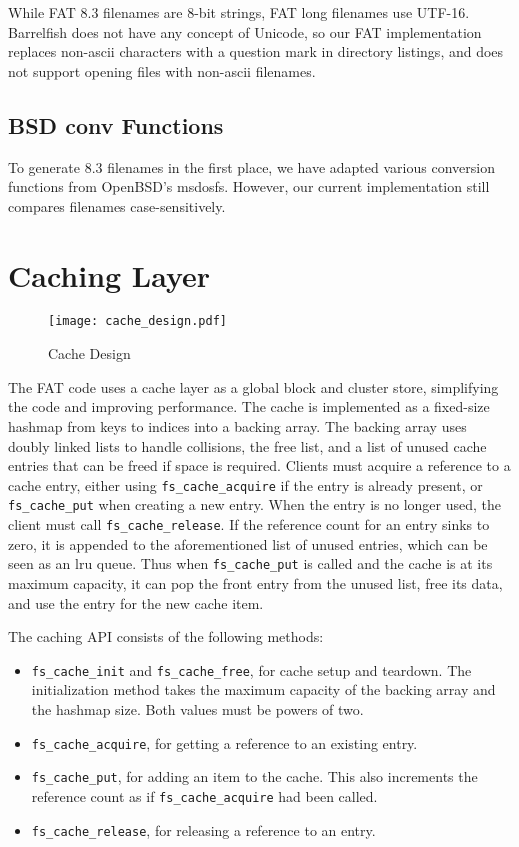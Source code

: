 While FAT 8.3 filenames are 8-bit strings, FAT long filenames use UTF-16.
Barrelfish does not have any concept of Unicode, so our FAT implementation
replaces non-\acs{ascii} characters with a question mark in directory listings,
and does not support opening files with non-\acs{ascii} filenames.

\subsection{BSD conv Functions}

To generate 8.3 filenames in the first place, we have adapted various
conversion functions from OpenBSD's msdosfs. However, our current
implementation still compares filenames case-sensitively.

\section{Caching Layer}

\begin{figure}[htb]
\centering
\texttt{[image: cache\_design.pdf]}
\caption{Cache Design}
\label{fig:cache_design}
\end{figure}

The FAT code uses a cache layer as a global block and cluster store,
simplifying the code and improving performance. The cache is implemented as a
fixed-size hashmap from keys to indices into a backing array. The backing array
uses doubly linked lists to handle collisions, the free list, and a list of
unused cache entries that can be freed if space is required. Clients must
acquire a reference to a cache entry, either using \lstinline+fs_cache_acquire+
if the entry is already present, or \lstinline+fs_cache_put+ when creating a
new entry. When the entry is no longer used, the client must call
\lstinline+fs_cache_release+. If the reference count for an entry sinks to
zero, it is appended to the aforementioned list of unused entries, which can be
seen as an \acs{lru} queue. Thus when \lstinline+fs_cache_put+ is called and
the cache is at its maximum capacity, it can pop the front entry from the
unused list, free its data, and use the entry for the new cache item.

The caching API consists of the following methods:
\begin{itemize}
	\item \lstinline+fs_cache_init+ and \lstinline+fs_cache_free+, for cache
		setup and teardown. The initialization method takes the maximum capacity
		of the backing array and the hashmap size. Both values must be powers of
		two.
	\item \lstinline+fs_cache_acquire+, for getting a reference to an existing
		entry.
	\item \lstinline+fs_cache_put+, for adding an item to the cache. This also
		increments the reference count as if \lstinline+fs_cache_acquire+ had
		been called.
	\item \lstinline+fs_cache_release+, for releasing a reference to an entry.
\end{itemize}


